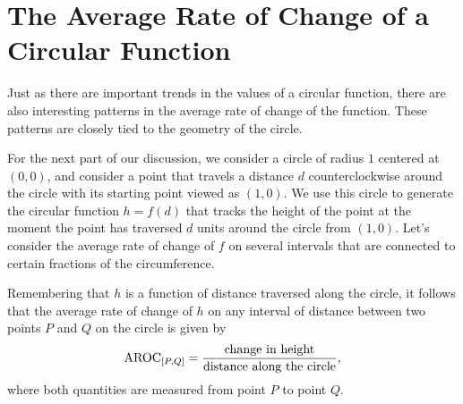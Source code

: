 \documentclass[nooutcomes, noauthor]{ximera}
\begin{document}




\section{The Average Rate of Change of a Circular Function}

Just as there are important trends in the values of a circular function, there are also interesting patterns in the average rate of change of the function.  These patterns are closely tied to the geometry of the circle.%

For the next part of our discussion, we consider a circle of radius \(1\) centered at \((0,0)\), and consider a point that travels a distance \(d\) counterclockwise around the circle with its starting point viewed as \((1,0)\).  We use this circle to generate the circular function \(h = f(d)\) that tracks the height of the point at the moment the point has traversed \(d\) units around the circle from \((1,0)\).  Let's consider the average rate of change of \(f\) on several intervals that are connected to certain fractions of the circumference.%

Remembering that \(h\) is a function of distance traversed along the circle, it follows that the average rate of change of \(h\) on any interval of distance between two points \(P\) and \(Q\) on the circle is given by%
\begin{equation*}
\mathrm{AROC}_{[P,Q]} = \frac{\text{change in height}}{\text{distance along the circle}}\text{,}
\end{equation*}
where both quantities are measured from point \(P\) to point \(Q\).%
\end{document}
